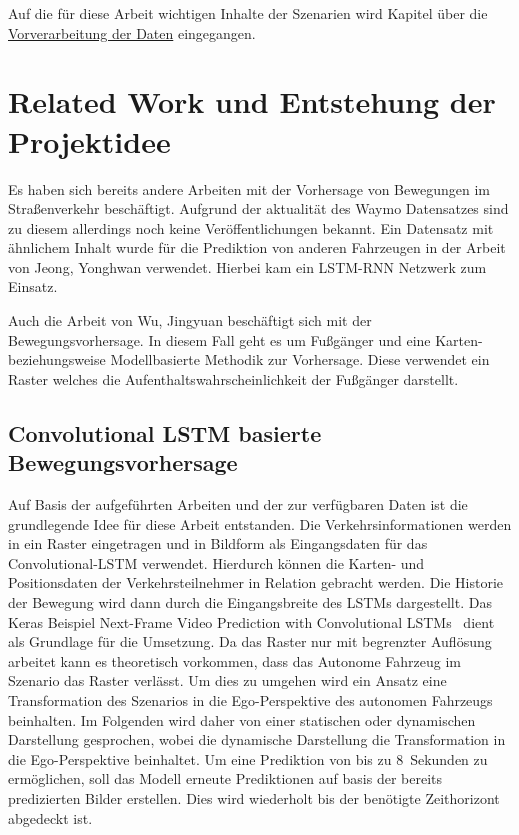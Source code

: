 \documentclass[12pt]{article}
\begin{document}
        Auf die für diese Arbeit wichtigen Inhalte der Szenarien wird Kapitel über die \hyperref[sec:preprocessing]{Vorverarbeitung der Daten} eingegangen.

\newpage

\section{Related Work und Entstehung der Projektidee}
    Es haben sich bereits andere Arbeiten mit der Vorhersage von Bewegungen im Straßenverkehr beschäftigt. 
    Aufgrund der aktualität des Waymo Datensatzes sind zu diesem allerdings noch keine Veröffentlichungen bekannt. 
    Ein Datensatz mit ähnlichem Inhalt wurde für die Prediktion von anderen Fahrzeugen in der Arbeit von Jeong, Yonghwan verwendet. 
    Hierbei kam ein LSTM-RNN Netzwerk zum Einsatz.~\cite{Yonghwan2020}
    
    Auch die Arbeit von Wu, Jingyuan beschäftigt sich mit der Bewegungsvorhersage. 
    In diesem Fall geht es um Fußgänger und eine Karten- beziehungsweise Modellbasierte Methodik zur Vorhersage. 
    Diese verwendet ein Raster welches die Aufenthaltswahrscheinlichkeit der Fußgänger darstellt.~\cite{Jingyuan2018}

    \subsection{Convolutional LSTM basierte Bewegungsvorhersage}
    Auf Basis der aufgeführten Arbeiten und der zur verfügbaren Daten ist die grundlegende Idee für diese Arbeit entstanden. 
    Die Verkehrsinformationen werden in ein Raster eingetragen und in Bildform als Eingangsdaten für das Convolutional-LSTM verwendet.
    Hierdurch können die Karten- und Positionsdaten der Verkehrsteilnehmer in Relation gebracht werden. 
    Die Historie der Bewegung wird dann durch die Eingangsbreite des LSTMs dargestellt. 
    Das Keras Beispiel \grqq Next-Frame Video Prediction with Convolutional LSTMs\grqq ~\cite{Keras2021} dient als Grundlage für die Umsetzung.
    Da das Raster nur mit begrenzter Auflösung arbeitet kann es theoretisch vorkommen, dass das Autonome Fahrzeug 
    im Szenario das Raster verlässt. Um dies zu umgehen wird ein Ansatz eine Transformation des Szenarios in die Ego-Perspektive des autonomen Fahrzeugs beinhalten. 
    Im Folgenden wird daher von einer statischen oder dynamischen Darstellung gesprochen, wobei die dynamische Darstellung die Transformation in die Ego-Perspektive beinhaltet. 
    Um eine Prediktion von bis zu 8~Sekunden zu ermöglichen, soll das Modell erneute Prediktionen auf basis der bereits predizierten Bilder erstellen. 
    Dies wird wiederholt bis der benötigte Zeithorizont abgedeckt ist.  
\end{document}
